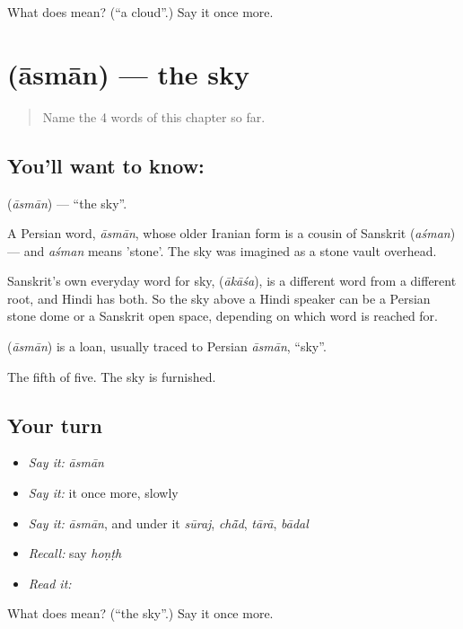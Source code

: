 \begin{tcolorbox}[breakable,colback=teal!4,colframe=teal!35!black,title={Before you move on}]
What does  mean? (\textquotedblleft{}a cloud\textquotedblright{}.) Say it once more.
\end{tcolorbox}
\section[\texorpdfstring{\hi{आसमान} (āsmān)}{आसमान (āsmān)}]{ (āsmān) — the sky}

\label{lesson:HI-C55-sky}



\begin{quote}
Name the 4 words of this chapter so far.
\end{quote}

\subsection*{You'll want to know: }
\textbf{} (\emph{āsmān}) — \textquotedblleft{}the sky\textquotedblright{}.

A Persian word, \emph{āsmān}, whose older Iranian form is a cousin of Sanskrit  (\emph{aśman}) — and \emph{aśman} means 'stone'. The sky was imagined as a stone vault overhead.

Sanskrit's own everyday word for sky,  (\emph{ākāśa}), is a different word from a different root, and Hindi has both. So the sky above a Hindi speaker can be a Persian stone dome or a Sanskrit open space, depending on which word is reached for.

\begin{cousinweb}
\textbf{} (\emph{āsmān}) is a loan, usually traced to Persian \emph{āsmān}, \textquotedblleft{}sky\textquotedblright{}.
\end{cousinweb}

\begin{grammarlens}[title={What you've built}]
The fifth of five. The sky is furnished.
\end{grammarlens}

\subsection*{Your turn}
\begin{itemize}
\raggedright
  \item \emph{Say it:} \emph{āsmān}
  \item \emph{Say it:} it once more, slowly
  \item \emph{Say it:} \emph{āsmān}, and under it \emph{sūraj}, \emph{chā̃d}, \emph{tārā}, \emph{bādal}
  \item \emph{Recall:} say \emph{hoṇṭh}
  \item \emph{Read it:} \textbf{}
\end{itemize}

\begin{tcolorbox}[breakable,colback=teal!4,colframe=teal!35!black,title={Before you move on}]
What does  mean? (\textquotedblleft{}the sky\textquotedblright{}.) Say it once more.
\end{tcolorbox}
